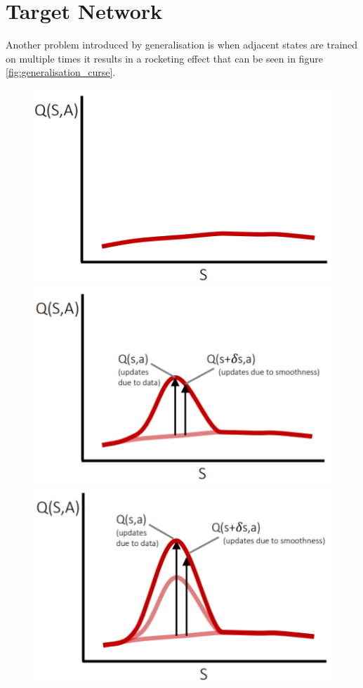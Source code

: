 \section{Target Network }

Another problem introduced by generalisation is when adjacent states are trained on multiple times
it results in a rocketing effect \cite{lecture_dqn} that can be seen in figure \ref{fig:generalisation_curse}.  

\begin{figure}[H]
\centering
\includegraphics[scale=0.5]{figures/target 1.PNG}
\includegraphics[scale=0.5]{figures/target 2.PNG}\\
\includegraphics[scale=0.5]{figures/target 3.PNG}

\end{figure}
